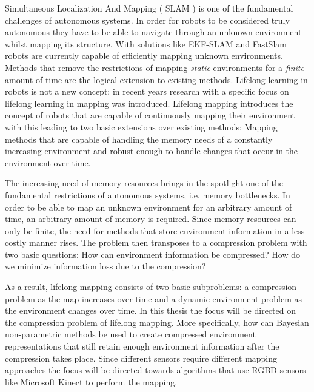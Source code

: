 \documentclass [twoside,hidelinks]{article}
\begin{document}
Simultaneous Localization And Mapping ( SLAM ) is one of the fundamental challenges of autonomous systems\cite{probRobs}. 
In order for robots to be considered truly autonomous they have to be able to navigate through an unknown environment whilst mapping its structure.
With solutions like EKF-SLAM\cite{ekf} and FastSlam\cite{SLAM} robots are currently capable of efficiently mapping unknown environments. 
Methods that remove the restrictions of mapping \textit{static} environments for a \textit{finite} amount of time are the logical extension to existing methods.
Lifelong learning in robots is not a new concept\cite{liflonglearning}; in recent years research with a specific focus on lifelong learning in mapping\cite{lifelongmaps} was introduced.  Lifelong mapping introduces the concept of robots that are capable of continuously mapping their environment with this leading to two basic extensions over existing methods: Mapping methods that are capable of handling the memory needs of a constantly increasing environment and robust enough to handle changes that occur in the environment over time. 

The increasing need of memory resources brings in the spotlight one of the fundamental restrictions of autonomous systems, i.e. memory bottlenecks. In order to be able to map an unknown environment for an arbitrary amount of time, an arbitrary amount of memory is required. Since memory resources can only be finite, the need for methods that store environment information in a less costly manner rises. The problem then transposes to a compression problem with two basic questions: How can environment information be compressed? How do we minimize information loss due to the compression?

As a result, lifelong mapping consists of two basic subproblems: a compression problem as the map increases over time and a dynamic environment problem as the environment changes over time\cite{aishalong}. In this thesis the focus will be directed on the compression problem of lifelong mapping. More specifically, how can Bayesian non-parametric methods be used to create compressed environment representations that still retain enough environment information after the compression takes place. Since different sensors require different mapping approaches the focus will be directed towards algorithms that use RGBD sensors like Microsoft Kinect to perform the mapping. 
\end{document}
